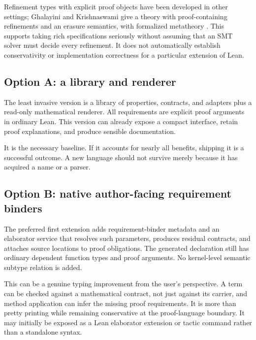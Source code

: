\documentclass[11pt,a4paper]{article}
\theoremstyle{definition}
\theoremstyle{remark}
\begin{document}
Refinement types with explicit proof objects have been developed in other settings; Ghalayini and Krishnaswami give a theory with proof-containing refinements and an erasure semantics, with formalized metatheory \cite{explicitref}. This supports taking rich specifications seriously without assuming that an SMT solver must decide every refinement. It does not automatically establish conservativity or implementation correctness for a particular extension of Lean.

\subsection{Option A: a library and renderer}
The least invasive version is a library of properties, contracts, and adapters plus a read-only mathematical renderer. All requirements are explicit proof arguments in ordinary Lean. This version can already expose a compact interface, retain proof explanations, and produce sensible documentation.

It is the necessary baseline. If it accounts for nearly all benefits, shipping it is a successful outcome. A new language should not survive merely because it has acquired a name or a parser.

\subsection{Option B: native author-facing requirement binders}
The preferred first extension adds requirement-binder metadata and an elaborator service that resolves such parameters, produces residual contracts, and attaches source locations to proof obligations. The generated declaration still has ordinary dependent function types and proof arguments. No kernel-level semantic subtype relation is added.

This can be a genuine typing improvement from the user's perspective. A term can be checked against a mathematical contract, not just against its carrier, and method application can infer the missing proof requirements. It is more than pretty printing while remaining conservative at the proof-language boundary. It may initially be exposed as a Lean elaborator extension or tactic command rather than a standalone syntax.
\end{document}

